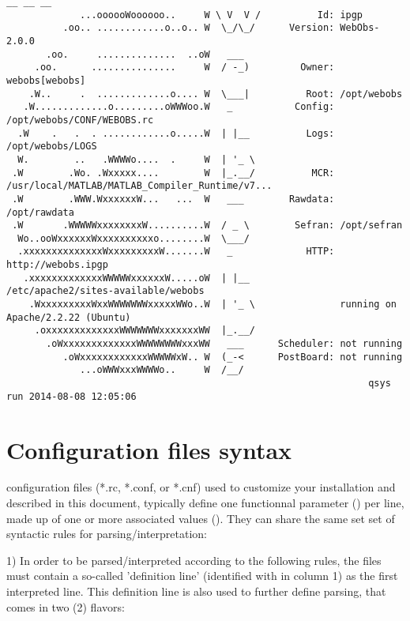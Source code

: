 \begin{lstlisting}[style=console,title=\wofile{qsys} example]
                                     __ __ __
             ...oooooWoooooo..     W \ V  V /          Id: ipgp
          .oo.. ............o..o.. W  \_/\_/      Version: WebObs-2.0.0
       .oo.     ..............  ..oW   ___ 
     .oo.      ...............     W  / -_)         Owner: webobs[webobs]
    .W..     .  .............o.... W  \___|          Root: /opt/webobs
   .W.............o.........oWWWoo.W   _           Config: /opt/webobs/CONF/WEBOBS.rc
  .W    .   .  . ............o.....W  | |__          Logs: /opt/webobs/LOGS
  W.        ..   .WWWWo....  .     W  | '_ \
 .W        .Wo. .Wxxxxx....        W  |_.__/          MCR: /usr/local/MATLAB/MATLAB_Compiler_Runtime/v7...
 .W        .WWW.WxxxxxxW...   ...  W   ___        Rawdata: /opt/rawdata
 .W       .WWWWWxxxxxxxxW..........W  / _ \        Sefran: /opt/sefran
  Wo..ooWxxxxxxWxxxxxxxxxxo........W  \___/
  .xxxxxxxxxxxxxxWxxxxxxxxxW.......W   _             HTTP: http://webobs.ipgp
   .xxxxxxxxxxxxxWWWWWxxxxxxW.....oW  | |__                /etc/apache2/sites-available/webobs
    .WxxxxxxxxxWxxWWWWWWWxxxxxWWo..W  | '_ \               running on Apache/2.2.22 (Ubuntu)
     .oxxxxxxxxxxxxxWWWWWWWxxxxxxxWW  |_.__/
       .oWxxxxxxxxxxxxxWWWWWWWWxxxWW   ___      Scheduler: not running
          .oWxxxxxxxxxxxxWWWWWxW.. W  (_-<      PostBoard: not running
             ...oWWWxxxWWWWo..     W  /__/
                                                                qsys run 2014-08-08 12:05:06

\end{lstlisting}

\section{Configuration files syntax}

\webobs configuration files (*.rc, *.conf, or *.cnf) used to customize your installation
and described in this document, typically define one 
functionnal parameter () per line, made up of one or more associated values
(\wocmd{fields}). They can share the same set set of syntactic rules for  
parsing/interpretation:

1) In order to be parsed/interpreted according to the following rules, the files must
contain a so-called 'definition line' (identified with \wocmd{=} in column 1) as the 
first interpreted line. This definition line is also used to further define parsing, 
that comes in two (2) flavors:

